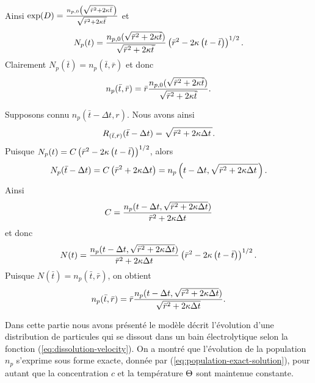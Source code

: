 Ainsi
$\exp(D) = \frac{n_{p,0}\left( \sqrt{\bar r^2 + 2\kappa \bar t\,} \right)}{\sqrt{\bar r^2 + 2\kappa \bar t\,}}$
et
\begin{equation*}
  N_p(t) = \frac{n_{p,0}(\sqrt{\bar r^2 + 2\kappa \bar
      t})}{\sqrt{\bar r^2 + 2\kappa \bar t\,}}\left( \bar r^2 -
    2\kappa \left( t - \bar t \right) \right)^{1/2}.
\end{equation*}
Clairement
$N_p(\bar t) = n_p(\bar t, \bar r)$
et donc
\begin{equation}\label{eq:population-exact-solution}
  n_p(\bar t, \bar r) = \bar r\frac{n_{p,0}(\sqrt{\bar r^2 +
      2\kappa \bar t})}{\sqrt{\bar r^2+2\kappa \bar t}}.
\end{equation}

\begin{remarque}\label{rem:population-exact-step}
  Supposons connu $n_p(\bar t - \Delta t, r)$. Nous avons ainsi
  \begin{equation*}
    R_{(\bar t, \bar r)}(\bar t - \Delta t) = \sqrt{\bar r^2 +
      2\kappa \Delta t\,}.
  \end{equation*}
  Puisque $N_p(t) = C\left( \bar r^2 - 2\kappa\left( t -
      \bar t \right) \right)^{1/2}$, alors
  \begin{equation*}
N_p(\bar t - \Delta t) = C\left( \bar r^2 + 2\kappa \Delta
  t \right) = n_p\left( t - \Delta t, \sqrt{\bar r^2 + 2\kappa
    \Delta t\,} \right).
  \end{equation*}
  Ainsi
  \begin{equation*}
    C = \frac{n_p(t - \Delta t, \sqrt{\bar r^2 + 2\kappa
        \Delta t})}{\bar r^2 + 2\kappa\Delta t}
  \end{equation*}
  et donc
  \begin{equation*}
    N(t) = \frac{n_p(t - \Delta t, \sqrt{\bar r^2 + 2\kappa
        \Delta t})}{\bar r^2 + 2\kappa\Delta t}\left( \bar
      r^2 - 2\kappa\left( t - \bar t \right) \right)^{1/2}.
  \end{equation*}
  Puisque $N(\bar t) = n_p(\bar t, \bar r)$, on obtient
  \begin{equation*}
    n_p(\bar t, \bar r) = \bar r\frac{n_p(t - \Delta t, \sqrt{\bar
        r^2 + 2\kappa \Delta t})}{\sqrt{\bar r^2 +
        2\kappa \Delta t}}.
  \end{equation*}
\end{remarque}

Dans cette partie nous avons présenté le modèle décrit l'évolution d'une
distribution de particules qui se dissout dans un bain électrolytique
selon la fonction (\ref{eq:dissolution-velocity}). On a montré que
l'évolution de la population $n_p$ s'exprime sous forme exacte,
donnée par (\ref{eq:population-exact-solution}), pour
autant que la concentration $c$ et la température $\Theta$
sont maintenue constante.


